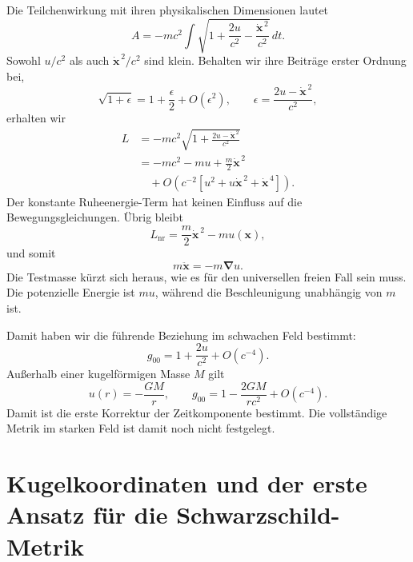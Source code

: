 Die Teilchenwirkung mit ihren physikalischen Dimensionen lautet
\begin{equation}
A=-mc^2\int
\sqrt{1+\frac{2u}{c^2}
-\frac{\dot{\mathbf{x}}^{\,2}}{c^2}}\,dt.
\label{eq:l5-weak-action}
\end{equation}
Sowohl \(u/c^2\) als auch \(\dot{\mathbf{x}}^{\,2}/c^2\) sind klein. Behalten wir ihre Beiträge erster Ordnung bei,
\begin{equation}
\sqrt{1+\epsilon}
=1+\frac{\epsilon}{2}+O(\epsilon^2),
\qquad
\epsilon=\frac{2u-\dot{\mathbf{x}}^{\,2}}{c^2},
\end{equation}
erhalten wir
\begin{align}
L
&=-mc^2
\sqrt{1+\frac{2u-\dot{\mathbf{x}}^{\,2}}{c^2}}\\
&=-mc^2-mu+\frac{m}{2}\dot{\mathbf{x}}^{\,2}\\
&\quad+O\!\left(c^{-2}
 [u^2+u\dot{\mathbf{x}}^{\,2}+\dot{\mathbf{x}}^{\,4}]\right).
\label{eq:l5-newton-expansion}
\end{align}
Der konstante Ruheenergie-Term hat keinen Einfluss auf die Bewegungsgleichungen. Übrig bleibt
\begin{equation}
L_{\mathrm{nr}}
=\frac{m}{2}\dot{\mathbf{x}}^{\,2}-m u(\mathbf{x}),
\label{eq:l5-newton-lagrangian}
\end{equation}
und somit
\begin{equation}
m\ddot{\mathbf{x}}=-m\boldsymbol{\nabla}u.
\label{eq:l5-newton-equation}
\end{equation}
Die Testmasse kürzt sich heraus, wie es für den universellen freien Fall sein muss. Die potenzielle Energie ist \(m u\), während die Beschleunigung unabhängig von \(m\) ist.

Damit haben wir die führende Beziehung im schwachen Feld bestimmt:
\begin{equation}
g_{00}=1+\frac{2u}{c^2}+O(c^{-4}).
\label{eq:l5-g00-newton}
\end{equation}
Außerhalb einer kugelförmigen Masse \(M\) gilt
\begin{equation}
u(r)=-\frac{GM}{r},
\qquad
g_{00}=1-\frac{2GM}{rc^2}+O(c^{-4}).
\label{eq:l5-g00-spherical}
\end{equation}
Damit ist die erste Korrektur der Zeitkomponente bestimmt. Die vollständige Metrik im starken Feld ist damit noch nicht festgelegt.

\section{Kugelkoordinaten und der erste Ansatz für die Schwarzschild-Metrik}

